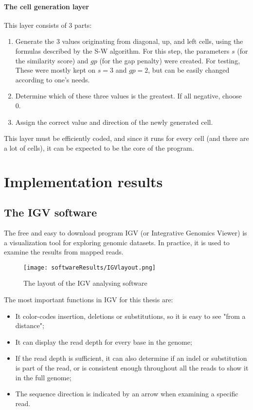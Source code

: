 \paragraph{The cell generation layer}
This layer consists of 3 parts:
\begin{enumerate}
	\item Generate the 3 values originating from diagonal, up, and left cells, using the formulas described by the S-W algorithm. For this step, the parameters $s$ (for the similarity score) and $gp$ (for the gap penalty) were created. For testing, These were mostly kept on $s=3$ and $gp=2$, but can be easily changed according to one's needs.
	\item Determine which of these three values is the greatest. If all negative, choose 0.
	\item Assign the correct value and direction of the newly generated cell.
\end{enumerate}

This layer must be efficiently coded, and since it runs for every cell (and there are a lot of cells), it can be expected to be the core of the program.

\section{Implementation results}

\subsection{The IGV software}

The free and easy to download program IGV %
(or Integrative Genomics Viewer) is a visualization tool for exploring genomic datasets. In practice, it is used to examine the results from mapped reads.

\begin{figure}[H]
	\centering
	\texttt{[image: softwareResults/IGVlayout.png]}
	\caption{The layout of the IGV analysing software}
	\label{fig:IGVlayout}
\end{figure}

The most important functions in IGV for this thesis are: 
\begin{itemize}
	\item It color-codes insertion, deletions or substitutions, so it is easy to see "from a distance";
	\item It can display the read depth for every base in the genome;
	\item If the read depth is sufficient, it can also determine if an indel or substitution is part of the read, or is consistent enough throughout all the reads to show it in the full genome;
	\item The sequence direction is indicated by an arrow when examining a specific read.
\end{itemize}

